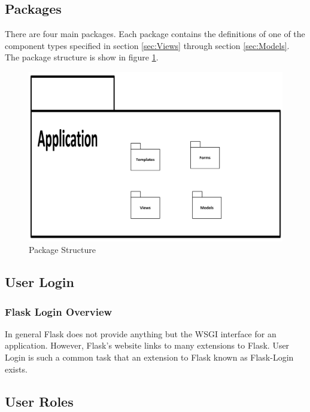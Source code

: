 \documentclass{article}
\begin{document}
\subsection{Packages}

There are four main packages. Each package contains the definitions of one of the component types specified in section \ref{sec:Views} through section \ref{sec:Models}. The package structure is show in figure \ref{fig:PackageStructure}.

\FloatBarrier
\begin{figure}[h1]
\centering
\includegraphics[scale=.75]{img/applicationStructure}
\caption{Package Structure}
\label{fig:PackageStructure}
\end{figure}
\FloatBarrier

\subsection{User Login}

\subsubsection{Flask Login Overview}

In general Flask does not provide anything but the WSGI interface for an application. However, Flask's website links to many
extensions to Flask. User Login is such a common task that an extension to Flask known as Flask-Login exists.

\subsection{User Roles}
\end{document}
